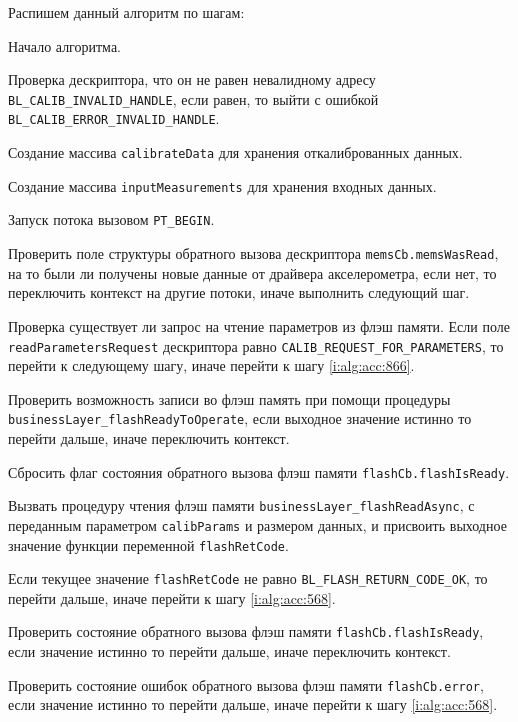 Распишем данный алгоритм по шагам:
\begin{enumerate_step}
    \item Начало алгоритма.
    \item Проверка дескриптора, что он не равен невалидному адресу \lstinline|BL_CALIB_INVALID_HANDLE|, если равен, то выйти с ошибкой
    \lstinline|BL_CALIB_ERROR_INVALID_HANDLE|.
    \item Создание массива \lstinline|calibrateData| для хранения откалиброванных данных.
    \item Создание массива \lstinline|inputMeasurements| для хранения входных данных.
    \item Запуск потока вызовом \lstinline|PT_BEGIN|.
    \item \label{i:alg:acc:850} Проверить поле структуры обратного вызова дескриптора \lstinline|memsCb.memsWasRead|, на то были ли получены новые данные от драйвера акселерометра, 
    если нет, то переключить контекст на другие потоки, иначе выполнить следующий шаг.
    \item \label{i:alg:acc:857} Проверка существует ли запрос на чтение параметров из флэш памяти. Если поле \lstinline|readParametersRequest| дескриптора равно \lstinline|CALIB_REQUEST_FOR_PARAMETERS|,
    то перейти к следующему шагу, иначе перейти к шагу \ref{i:alg:acc:866}.
    \item Проверить возможность записи во флэш память при помощи процедуры \lstinline|businessLayer_flashReadyToOperate|, если выходное значение истинно то перейти дальше, иначе переключить контекст.
    \item Сбросить флаг состояния обратного вызова флэш памяти \lstinline|flashCb.flashIsReady|.
    \item Вызвать процедуру чтения флэш памяти \lstinline|businessLayer_flashReadAsync|, с переданным параметром \lstinline|calibParams| и размером данных, и присвоить выходное значение функции переменной \lstinline|flashRetCode|.
    \item Если текущее значение \lstinline|flashRetCode| не равно \lstinline|BL_FLASH_RETURN_CODE_OK|, то перейти дальше, иначе перейти к шагу
    \ref{i:alg:acc:568}.
    \item Проверить состояние обратного вызова флэш памяти \lstinline|flashCb.flashIsReady|, если значение истинно то перейти дальше, иначе переключить контекст.
    \item Проверить состояние ошибок обратного вызова флэш памяти \lstinline|flashCb.error|, если значение истинно то перейти дальше, иначе перейти к шагу \ref{i:alg:acc:568}.

\end{enumerate_step}
